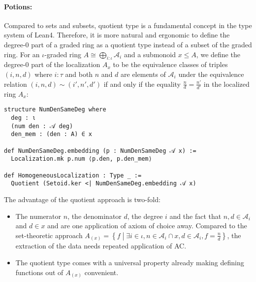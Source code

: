 \documentclass[graybox]{svmult}
\begin{document}
\paragraph{Potions:}%
Compared to sets and subsets, quotient type is a fundamental concept in the type system of Lean4. 
Therefore, it is more natural and ergonomic to define the degree-$0$ part of a graded ring as a quotient type 
instead of a subset of the graded ring. For an $\iota$-graded ring $A \cong \bigoplus_{i : \iota} \mathcal{A}_i$ and a submonoid $x \le A$, 
we define the degree-$0$ part of the localization $A_x$ to be the equivalence classes of triples $(i, n, d)$ where 
$i : \tau$ and both $n$ and $d$ are elements of $\mathcal{A}_i$ under the equivalence relation 
$(i, n, d) \sim (i', n', d')$ if and only if the equality $\frac{n}{d} = \frac{n'}{d'}$ in the localized ring $A_x$:
\begin{lstlisting}
structure NumDenSameDeg where
  deg : ι
  (num den : 𝒜 deg)
  den_mem : (den : A) ∈ x

def NumDenSameDeg.embedding (p : NumDenSameDeg 𝒜 x) :=
  Localization.mk p.num ⟨p.den, p.den_mem⟩

def HomogeneousLocalization : Type _ :=
  Quotient (Setoid.ker <| NumDenSameDeg.embedding 𝒜 x)
\end{lstlisting}
The advantage of the quotient approach is two-fold:
\begin{itemize}
  \item The numerator $n$, the denominator $d$, the degree $i$ and the fact that $n, d \in \mathcal{A}_i$ and $d \in x$ and  are one application of axiom of choice away.
  Compared to the set-theoretic approach $A_{(x)} = \left\{f\middle|\exists i \in \iota, n \in \mathcal{A}_i \cap x, d \in \mathcal{A}_i, f = \frac{n}{d}\right\}$, the extraction of the data needs repeated application of AC.
  \item The quotient type comes with a universal property already making defining functions out of $A_{(x)}$ convenient.
\end{itemize}
\end{document}
